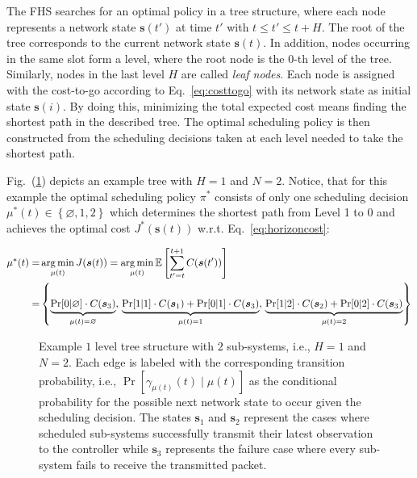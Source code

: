 The FHS searches for an optimal policy in a tree structure, where each node
represents a network state $\boldsymbol{s}(t')$ at time $t'$ with $t \leq t'
\leq t+H$. The root of the tree corresponds to the current network state
$\boldsymbol{s}(t)$. In addition, nodes occurring in the same slot form a level,
where the root node is the 0-th level of the tree. Similarly, nodes in the last
level $H$ are called \textit{leaf nodes}. Each node is assigned with the
cost-to-go according to Eq.~\eqref{eq:costtogo} with its network state as
initial state $\boldsymbol{s}(i)$. By doing this, minimizing the total expected
cost means finding the shortest path in the described tree. The optimal
scheduling policy is then constructed from the scheduling decisions taken at
each level needed to take the shortest path.

Fig.~(\ref{fig:FHStree}) depicts an example tree with $H=1$ and $N=2$. Notice,
that for this example the optimal scheduling policy $\pi^*$ consists of only one
scheduling decision $\mu^*(t) \in \left\{\varnothing, 1, 2 \right\}$ which
determines the shortest path from Level 1 to 0 and achieves the optimal cost
$J^*(\boldsymbol{s}(t))$ w.r.t. Eq.~\eqref{eq:horizoncost}:

\begin{align*}
  \mu^*(t) =& \operatorname*{arg\,min}_{\mu(t)}{J(\boldsymbol{s}(t))}
  = \operatorname*{arg\,min}_{\mu(t)}{\mathbb{E} \left[ \sum_{t' = t }^{t + 1} C(\boldsymbol{s}(t')) \right]} \\
  =& \left\{
  \underbrace{\Pr[0|\varnothing] \cdot C(\boldsymbol{s}_3)}_{\mu(t)=\varnothing}, \,
  \underbrace{\Pr[1|1] \cdot C(\boldsymbol{s}_1) + \Pr[0|1] \cdot C(\boldsymbol{s}_3)}_{\mu(t)=1}, \,
  \underbrace{\Pr[1|2] \cdot C(\boldsymbol{s}_2) + \Pr[0|2] \cdot C(\boldsymbol{s}_3)}_{\mu(t)=2} 
  \right\}
\end{align*}


\begin{figure}[htb]
	\centering
	\resizebox{.8\columnwidth}{!}{}
  \caption[Example tree structure for FHS with 2 sub-systems and Finite Horizon
  1]{Example $1$ level tree structure with $2$ sub-systems, i.e., $H=1$ and
  $N=2$. Each edge is labeled with the corresponding transition probability,
  i.e., $\Pr{[\gamma_{\mu(t)}(t)\mid \mu(t)]}$ as the conditional probability
  for the possible next network state to occur given the scheduling decision.
  The states $\textbf{s}_1$ and $\textbf{s}_2$ represent the cases where
  scheduled sub-systems successfully transmit their latest observation to the
  controller while $\textbf{s}_3$ represents the failure case where every
  sub-system fails to receive the transmitted packet.}
	\label{fig:FHStree}
\end{figure}

